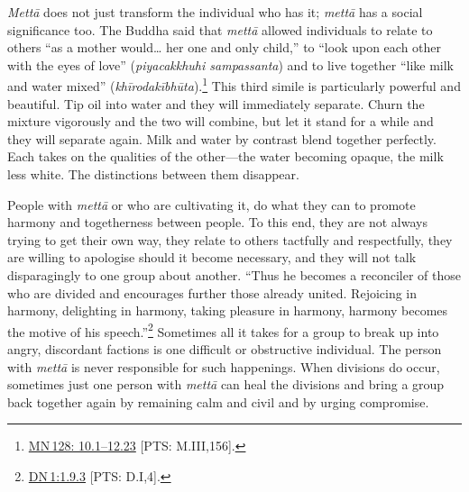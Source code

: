\documentclass[10pt, openright]{book}
\begin{document}
\textit{Mettā} does not just transform the individual who has it; \textit{mettā} has a social significance too. The Buddha said that \textit{mettā} allowed individuals to relate to others “as a mother would… her one and only child,” to “look upon each other with the eyes of love” (\textit{piyacakkhuhi sampassanta}) and to live together “like milk and water mixed” (\textit{khīrodakībhūta}).\footnote {\href{https://suttacentral.net/mn128/en/sujato\#10.1}{MN 128: 10.1–12.23} [PTS: M.III,156].} This third simile is particularly powerful and beautiful. Tip oil into water and they will immediately separate. Churn the mixture vigorously and the two will combine, but let it stand for a while and they will separate again. Milk and water by contrast blend together perfectly. Each takes on the qualities of the other—the water becoming opaque, the milk less white. The distinctions between them disappear.


People with \textit{mettā} or who are cultivating it, do what they can to promote harmony and togetherness between people. To this end, they are not always trying to get their own way, they relate to others tactfully and respectfully, they are willing to apologise should it become necessary, and they will not talk disparagingly to one group about another. “Thus he becomes a reconciler of those who are divided and encourages further those already united. Rejoicing in harmony, delighting in harmony, taking pleasure in harmony, harmony becomes the motive of his speech.”\footnote {\href{https://suttacentral.net/dn1/en/sujato\#1.9.3}{DN 1:1.9.3} [PTS: D.I,4].} Sometimes all it takes for a group to break up into angry, discordant factions is one difficult or obstructive individual. The person with \textit{mettā} is never responsible for such happenings. When divisions do occur, sometimes just one person with \textit{mettā} can heal the divisions and bring a group back together again by remaining calm and civil and by urging compromise.
\end{document}

